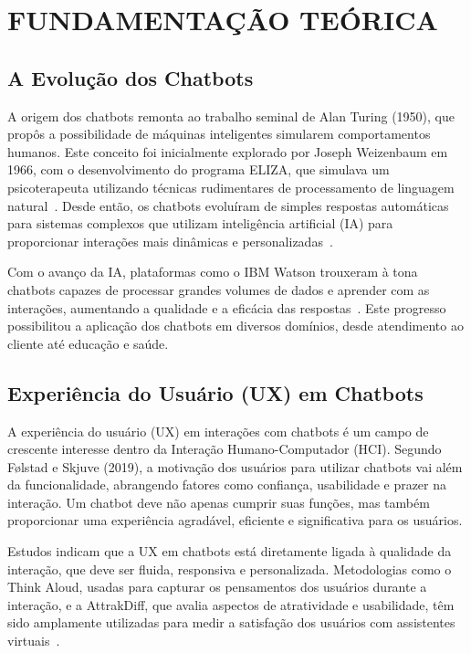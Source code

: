 \chapter{FUNDAMENTAÇÃO TEÓRICA}\label{cap:desenvolvimento}
\section{A Evolução dos Chatbots}

A origem dos chatbots remonta ao trabalho seminal de Alan Turing (1950), que propôs a possibilidade de máquinas inteligentes simularem comportamentos humanos. Este conceito foi inicialmente explorado por Joseph Weizenbaum em 1966, com o desenvolvimento do programa ELIZA, que simulava um psicoterapeuta utilizando técnicas rudimentares de processamento de linguagem natural~\cite{Weizenbaum_1966}. Desde então, os chatbots evoluíram de simples respostas automáticas para sistemas complexos que utilizam inteligência artificial (IA) para proporcionar interações mais dinâmicas e personalizadas~\cite{TURING:1950,IBM2024}.

Com o avanço da IA, plataformas como o IBM Watson trouxeram à tona chatbots capazes de processar grandes volumes de dados e aprender com as interações, aumentando a qualidade e a eficácia das respostas~\cite{IBM2024}. Este progresso possibilitou a aplicação dos chatbots em diversos domínios, desde atendimento ao cliente até educação e saúde.

\section{Experiência do Usuário (UX) em Chatbots}
A experiência do usuário (UX) em interações com chatbots é um campo de crescente interesse dentro da Interação Humano-Computador (HCI). Segundo Følstad e Skjuve (2019), a motivação dos usuários para utilizar chatbots vai além da funcionalidade, abrangendo fatores como confiança, usabilidade e prazer na interação. Um chatbot deve não apenas cumprir suas funções, mas também proporcionar uma experiência agradável, eficiente e significativa para os usuários.

Estudos indicam que a UX em chatbots está diretamente ligada à qualidade da interação, que deve ser fluida, responsiva e personalizada. Metodologias como o Think Aloud, usadas para capturar os pensamentos dos usuários durante a interação, e a AttrakDiff, que avalia aspectos de atratividade e usabilidade, têm sido amplamente utilizadas para medir a satisfação dos usuários com assistentes virtuais~\cite{Barbosa2022,Folstad2019,Carvalho2024,Borges2023}.

